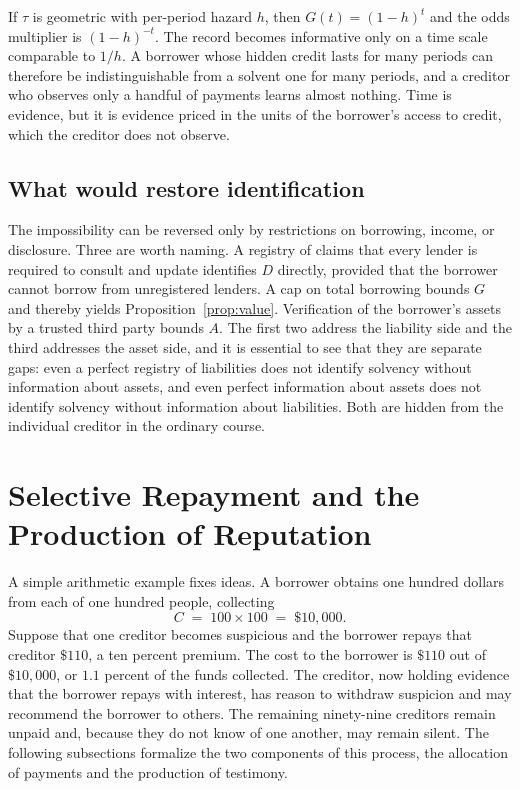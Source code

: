 \documentclass[11pt]{article}
\theoremstyle{definition}
\theoremstyle{remark}
\begin{document}
If $\tau$ is geometric with per-period hazard $h$, then $G(t)=(1-h)^t$ and the odds multiplier is $(1-h)^{-t}$. The record becomes informative only on a time scale comparable to $1/h$. A borrower whose hidden credit lasts for many periods can therefore be indistinguishable from a solvent one for many periods, and a creditor who observes only a handful of payments learns almost nothing. Time is evidence, but it is evidence priced in the units of the borrower's access to credit, which the creditor does not observe.

\subsection{What would restore identification}

The impossibility can be reversed only by restrictions on borrowing, income, or disclosure. Three are worth naming. A registry of claims that every lender is required to consult and update identifies $D$ directly, provided that the borrower cannot borrow from unregistered lenders. A cap on total borrowing bounds $G$ and thereby yields Proposition~\ref{prop:value}. Verification of the borrower's assets by a trusted third party bounds $A$. The first two address the liability side and the third addresses the asset side, and it is essential to see that they are separate gaps: even a perfect registry of liabilities does not identify solvency without information about assets, and even perfect information about assets does not identify solvency without information about liabilities. Both are hidden from the individual creditor in the ordinary course.

\section{Selective Repayment and the Production of Reputation}\label{sec:selective}

A simple arithmetic example fixes ideas. A borrower obtains one hundred dollars from each of one hundred people, collecting
\[
C \;=\; 100\times 100 \;=\; \$10{,}000 .
\]
Suppose that one creditor becomes suspicious and the borrower repays that creditor $\$110$, a ten percent premium. The cost to the borrower is $\$110$ out of $\$10{,}000$, or $1.1$ percent of the funds collected. The creditor, now holding evidence that the borrower repays with interest, has reason to withdraw suspicion and may recommend the borrower to others. The remaining ninety-nine creditors remain unpaid and, because they do not know of one another, may remain silent. The following subsections formalize the two components of this process, the allocation of payments and the production of testimony.
\end{document}
